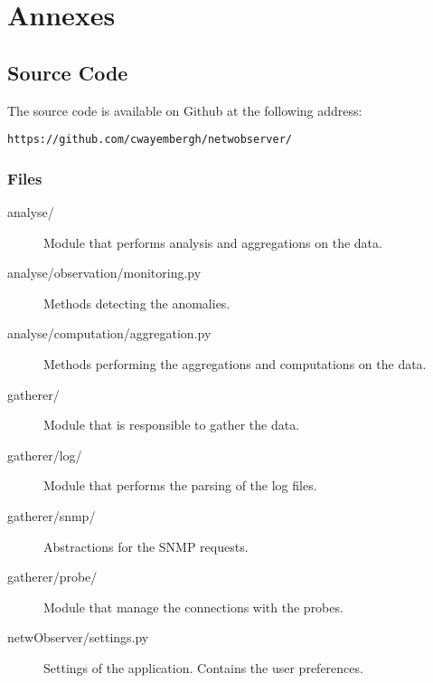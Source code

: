 

\chapter{Annexes} %
\label{AppendixA} %

\section{Source Code}

The source code is available on Github at the following address: 

\texttt{https://github.com/cwayembergh/netwobserver/}

\subsection*{Files}
\begin{description}
\item[analyse/] Module that performs analysis and aggregations on the data.
\item[analyse/observation/monitoring.py] Methods detecting the anomalies.
\item[analyse/computation/aggregation.py] Methods performing the aggregations and computations on the data.
\item[gatherer/] Module that is responsible to gather the data.
\item[gatherer/log/] Module that performs the parsing of the log files.
\item[gatherer/snmp/] Abstractions for the SNMP requests.
\item[gatherer/probe/] Module that manage the connections with the probes.
\item[netwObserver/settings.py] Settings of the application. Contains the user preferences.
\end{description}


